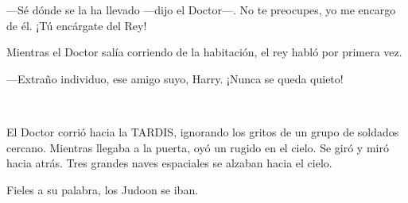---Sé dónde se la ha llevado ---dijo el Doctor---. No te preocupes, yo
me encargo de él. ¡Tú encárgate del Rey!

Mientras el Doctor salía corriendo de la habitación, el rey habló por
primera vez.

---Extraño individuo, ese amigo suyo, Harry. ¡Nunca se queda quieto!

~

El Doctor corrió hacia la TARDIS, ignorando los gritos de un grupo de
soldados cercano. Mientras llegaba a la puerta, oyó un rugido en el
cielo. Se giró y miró hacia atrás. Tres grandes naves espaciales se
alzaban hacia el cielo.

Fieles a su palabra, los Judoon se iban.